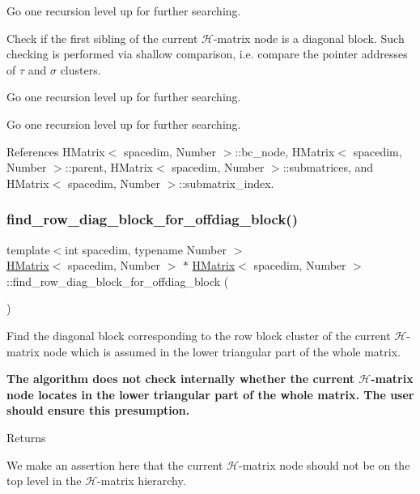 Go one recursion level up for further searching.

Check if the first sibling of the current $\mathcal{H}$-\/matrix node is a diagonal block. Such checking is performed via shallow comparison, i.\+e. compare the pointer addresses of $\tau$ and $\sigma$ clusters.

Go one recursion level up for further searching.

Go one recursion level up for further searching.

References H\+Matrix$<$ spacedim, Number $>$\+::bc\+\_\+node, H\+Matrix$<$ spacedim, Number $>$\+::parent, H\+Matrix$<$ spacedim, Number $>$\+::submatrices, and H\+Matrix$<$ spacedim, Number $>$\+::submatrix\+\_\+index.

\mbox{\label{classHMatrix_a1da518d5ca7e685e3e787f58dcad4e61}} 
\subsubsection{\texorpdfstring{find\+\_\+row\+\_\+diag\+\_\+block\+\_\+for\+\_\+offdiag\+\_\+block()}{find\_row\_diag\_block\_for\_offdiag\_block()}}
{\footnotesize\ttfamily template$<$int spacedim, typename Number $>$ \\
\hyperlink{classHMatrix}{H\+Matrix}$<$ spacedim, Number $>$ $\ast$ \hyperlink{classHMatrix}{H\+Matrix}$<$ spacedim, Number $>$\+::find\+\_\+row\+\_\+diag\+\_\+block\+\_\+for\+\_\+offdiag\+\_\+block (\begin{DoxyParamCaption}{ }\end{DoxyParamCaption})}

Find the diagonal block corresponding to the row block cluster of the current $\mathcal{H}$-\/matrix node which is assumed in the lower triangular part of the whole matrix.

{\bfseries The algorithm does not check internally whether the current $\mathcal{H}$-\/matrix node locates in the lower triangular part of the whole matrix. The user should ensure this presumption.}

\begin{DoxyReturn}{Returns}

\end{DoxyReturn}
We make an assertion here that the current $\mathcal{H}$-\/matrix node should not be on the top level in the $\mathcal{H}$-\/matrix hierarchy.

